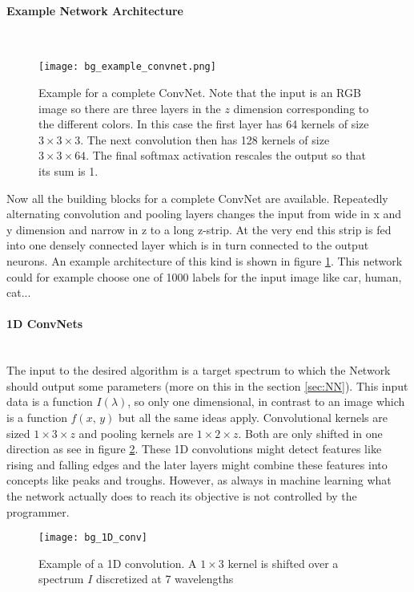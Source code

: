 \paragraph{Example Network Architecture}~\\
\begin{figure}[H]
    \centering
    \texttt{[image: bg\_example\_convnet.png]}
    \caption{Example for a complete ConvNet. Note that the input is an RGB image so there are three layers in the $z$ dimension corresponding to the different colors. In this case the first layer has 64 kernels of size $3 \times 3 \times 3$. The next convolution then has 128 kernels of size $3 \times 3 \times 64$. The final softmax activation rescales the output so that its sum is 1. \cite{cat}}
    \label{fig:bg:NN_example}
\end{figure}

Now all the building blocks for a complete ConvNet are available. Repeatedly alternating convolution and pooling layers changes the input from wide in x and y dimension and narrow in z to a long z-strip. At the very end this strip is fed into one densely connected layer which is in turn connected to the output neurons. An example architecture of this kind is shown in figure \ref{fig:bg:NN_example}. This network could for example choose one of 1000 labels for the input image like car, human, cat...



\paragraph{1D ConvNets}~\\
The input to the desired algorithm is a target spectrum to which the Network should output some parameters (more on this in the section \ref{sec:NN}). This input data is a function $I(\lambda)$, so only one dimensional, in contrast to an image which is a function $f(x, \, y)$ but all the same ideas apply. Convolutional kernels are sized $1 \times 3 \times z$ and pooling kernels are $1 \times 2 \times z$. Both are  only shifted in one direction as see in figure \ref{fig:bg:1D_conv}. These 1D convolutions might detect features like rising and falling edges and the later layers might combine these features into concepts like peaks and troughs. However, as always in machine learning what the network actually does to reach its objective is not controlled by the programmer.

\begin{figure}[H]
    \centering
    \texttt{[image: bg\_1D\_conv]}
    \caption{Example of a 1D convolution. A $1 \times 3$ kernel is shifted over a spectrum $I$ discretized at 7 wavelengths}
    \label{fig:bg:1D_conv}
\end{figure}
\vspace{1.5cm}

